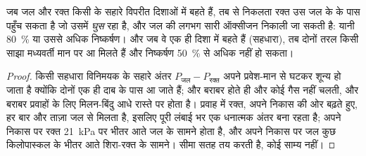 \begin{theorem}[प्रतिधारा विनिमय]\label{thm:b1:gas-exchange:countercurrent}
जब जल और रक्त किसी  के सहारे विपरीत दिशाओं में बहते हैं, तब
 से निकलता रक्त उस जल के  के पास पहुँच सकता है जो उसमें
\emph{घुस} रहा है, और जल की लगभग सारी ऑक्सीजन निकाली जा सकती है: यानी
\qty{80}{\%} या उससे अधिक निष्कर्षण। और जब वे एक ही दिशा में बहते हैं
(सहधारा), तब दोनों तरल किसी साझा मध्यवर्ती मान पर आ मिलते हैं और
निष्कर्षण \qty{50}{\%} से अधिक नहीं हो सकता।
\end{theorem}
\begin{proof}
किसी सहधारा विनिमयक के सहारे अंतर $P_{\text{जल}} -
P_{\text{रक्त}}$ अपने प्रवेश-मान से घटकर शून्य हो जाता है क्योंकि दोनों
एक ही दाब के पास आ जाते हैं; और बराबर होते ही और कोई गैस नहीं चलती,
और बराबर प्रवाहों के लिए मिलन-बिंदु आधे रास्ते पर होता है। 
प्रवाह में रक्त, अपने निकास की ओर बढ़ते हुए, हर बार और ताज़ा जल से मिलता
है, इसलिए पूरी लंबाई भर एक धनात्मक अंतर बना रहता है; अपने निकास पर रक्त
\qty{21}{kPa} पर भीतर आते जल के सामने होता है, और अपने निकास पर जल कुछ
किलोपास्कल के भीतर आते शिरा-रक्त के सामने। सीमा सतह तय करती है, कोई
साम्य नहीं।
\end{proof}

